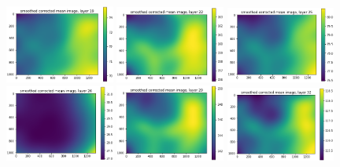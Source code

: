 \documentclass[letterpaper,11pt]{article}
\begin{document}
\begin{figure}[!ht]
\includegraphics[width=0.32\textwidth]{images/results/unmasked_smoothed_corrected_mean_image_layers/unmasked_smoothed_corrected_mean_image_layer_19}
\includegraphics[width=0.32\textwidth]{images/results/unmasked_smoothed_corrected_mean_image_layers/unmasked_smoothed_corrected_mean_image_layer_22}
\includegraphics[width=0.32\textwidth]{images/results/unmasked_smoothed_corrected_mean_image_layers/unmasked_smoothed_corrected_mean_image_layer_25}
\includegraphics[width=0.32\textwidth]{images/results/unmasked_smoothed_corrected_mean_image_layers/unmasked_smoothed_corrected_mean_image_layer_26}
\includegraphics[width=0.32\textwidth]{images/results/unmasked_smoothed_corrected_mean_image_layers/unmasked_smoothed_corrected_mean_image_layer_29}
\includegraphics[width=0.32\textwidth]{images/results/unmasked_smoothed_corrected_mean_image_layers/unmasked_smoothed_corrected_mean_image_layer_32}

\end{figure}
\end{document}
